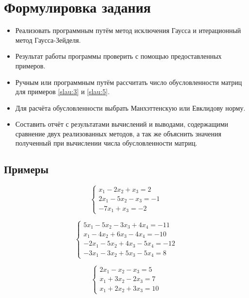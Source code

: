 \documentclass[a4paper]{article}
\begin{document}
\tableofcontents

\pagebreak

\section{Формулировка задания}
\begin{itemize}
    \item Реализовать программным путём метод исключения Гаусса и итерационный метод Гаусса-Зейделя. 
    \item Результат работы программы проверить с помощью предоставленных примеров.
    \item Ручным или программным путём рассчитать число обусловленности матриц для примеров \eqref{slau:3} и \eqref{slau:5}.
    \item Для расчёта обусловленности выбрать Манхэттенскую или Евклидову норму.
    \item Составить отчёт с результатами вычислений и выводами, содержащими сравнение двух реализованных методов, а так же объяснить значения полученный при вычислении числа обусловленности матриц.
\end{itemize}

\subsection{Примеры}

\begin{equation}
    \begin{cases*}
           x_1  -2 x_2 + x_3 = 2 \\
         2 x_1  -5 x_2 - x_3 = -1 \\
        -7 x_1  +  x_3       = -2
    \end{cases*} \label{slau:1}
\end{equation}

\begin{equation}
    \begin{cases}
         5 x_1 -5 x_2 -3 x_3 +4 x_4 = -11 \\
           x_1 -4 x_2 +6 x_3 -4 x_4 = -10 \\
        -2 x_1 -5 x_2 +4 x_3 -5 x_4 = -12 \\
        -3 x_1 -3 x_2 +5 x_3 -5 x_4 = 8
    \end{cases} \label{slau:2}
\end{equation}

\begin{equation}
    \begin{cases*}
        2 x_1 -   x_2 -   x_3 = 5 \\
          x_1 + 3 x_2 - 2 x_3 = 7 \\
          x_1 + 2 x_2 + 3 x_3 = 10
    \end{cases*} \label{slau:3}
\end{equation}
\end{document}
